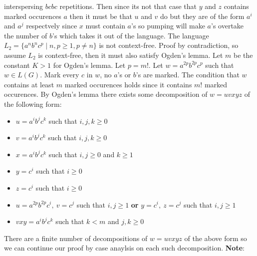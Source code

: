 \documentclass[12pt]{article}
\begin{document}
interspersing $bcbc$ repetitions. Then since its not that case that $y$ and $z$
contains marked occurences $a$ then it must be that $u$ and $v$ do but they are
of the form $a^i$ and $a^j$ respectvely since $x$ must contain $a$'s so pumping
will make $a$'s overtake the number of $b$'s which takes it out of the language.
\newpage
The language $L_2 = \{a^nb^nc^p \mid n,p\ge 1, p\neq n\}$ is not context-free.
Proof by contradiction, so assume $L_2$ is context-free, then it must also
satisfy Ogden's lemma. Let $m$ be the constant $K > 1$ for Ogden's lemma.
Let $p=m!$. Let $w = a^{2p}b^{2p}c^p$ such that $w \in L(G)$. Mark every $c$ in
$w$, no $a$'s or $b$'s are marked. The condition that $w$ contains at least $m$
marked occurences holds since it contains $m!$ marked occurences. By Ogden's
lemma there exists some decomposition of $w = uvxyz$ of the following form:
\begin{itemize}
\item $u=a^ib^jc^k$ such that $i,j,k\ge 0$
\item $v=a^ib^jc^k$ such that $i,j,k\ge 0$
\item $x=a^ib^jc^k$ such that $i,j\ge 0$ and $k\ge 1$
\item $y=c^i$ such that $i\ge 0$
\item $z=c^i$ such that $i\ge 0$
\item $u=a^{2p}b^{2p}c^i,\ v=c^j$ such that $i,j\ge 1$ \textbf{or}
$y=c^i,\ z=c^j$ such that $i,j\ge 1$
\item $vxy = a^ib^jc^k$ such that $k<m$ and $j,k\ge 0$
\end{itemize}
There are a finite number of decompositions of $w=uvxyz$ of the above form so we
can continue our proof by case anaylsis on each such decomposition.
\vspace{3mm}
\newline
\textbf{Note}:
\end{document}
